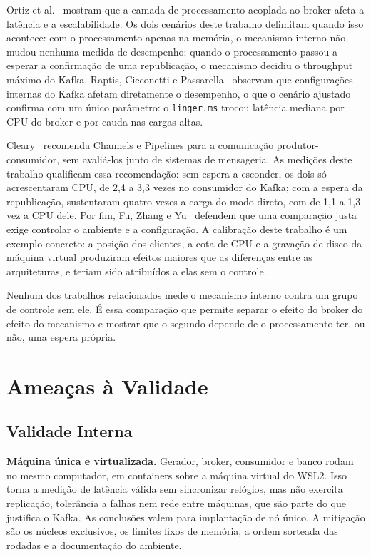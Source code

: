 \documentclass[12pt]{article}
\begin{document}
Ortiz et al.~\cite{ortiz:2023} mostram que a camada de processamento acoplada ao broker
afeta a latência e a escalabilidade. Os dois cenários deste trabalho delimitam quando
isso acontece: com o processamento apenas na memória, o mecanismo interno não mudou
nenhuma medida de desempenho; quando o processamento passou a esperar a confirmação de
uma republicação, o mecanismo decidiu o throughput máximo do Kafka. Raptis, Cicconetti e
Passarella~\cite{raptis:2024} observam que configurações internas do Kafka afetam
diretamente o desempenho, o que o cenário ajustado confirma com um único parâmetro: o
\texttt{linger.ms} trocou latência mediana por CPU do broker e por cauda nas cargas
altas.

Cleary~\cite{cleary:2019} recomenda Channels e Pipelines para a comunicação
produtor-consumidor, sem avaliá-los junto de sistemas de mensageria. As medições deste
trabalho qualificam essa recomendação: sem espera a esconder, os dois só acrescentaram
CPU, de 2,4 a 3,3 vezes no consumidor do Kafka; com a espera da republicação, sustentaram
quatro vezes a carga do modo direto, com de 1,1 a 1,3 vez a CPU dele. Por fim, Fu, Zhang e
Yu~\cite{fu:2021} defendem que uma comparação justa exige controlar o ambiente e a
configuração. A calibração deste trabalho é um exemplo concreto: a posição dos clientes,
a cota de CPU e a gravação de disco da máquina virtual produziram efeitos maiores que as
diferenças entre as arquiteturas, e teriam sido atribuídos a elas sem o controle.

Nenhum dos trabalhos relacionados mede o mecanismo interno contra um grupo de controle
sem ele. É essa comparação que permite separar o efeito do broker do efeito do mecanismo
e mostrar que o segundo depende de o processamento ter, ou não, uma espera própria.


\section{Ameaças à Validade}
\label{sec:ameacas}

\subsection{Validade Interna}

\textbf{Máquina única e virtualizada.} Gerador, broker, consumidor e banco rodam no mesmo
computador, em containers sobre a máquina virtual do WSL2. Isso torna a medição de
latência válida sem sincronizar relógios, mas não exercita replicação, tolerância a falhas
nem rede entre máquinas, que são parte do que justifica o Kafka. As conclusões valem para
implantação de nó único. A mitigação são os núcleos exclusivos, os limites fixos de
memória, a ordem sorteada das rodadas e a documentação do ambiente.
\end{document}

